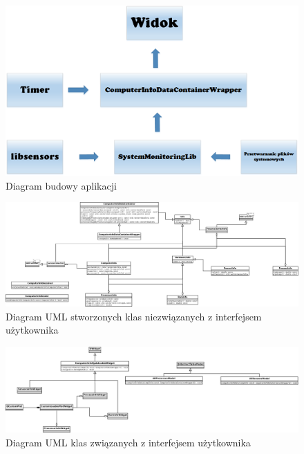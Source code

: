 \documentclass[a4paper]{article}
\begin{document}
\begin{figure}[h]
	\centering
	\includegraphics[width=\linewidth]{img/diagramBudowyAplikacji.png}
	\caption{Diagram budowy aplikacji}
	\label{diagram_budowy_aplikacji}
\end{figure}


\begin{figure}[h]
	\centering
	\includegraphics[width=0.75\paperheight, angle=90]{img/diagramKlas.png}
	\caption{Diagram UML stworzonych klas niezwiązanych z interfejsem użytkownika}
	\label{diagram_klas_system_monitoring}
\end{figure}

\begin{figure}[h]
	\centering
	\includegraphics[width=0.75\paperheight, angle=90]{img/diagramKlasGui.png}
	\caption{Diagram UML klas związanych z interfejsem użytkownika}
	\label{diagram_klas_gui}
\end{figure}
\end{document}
